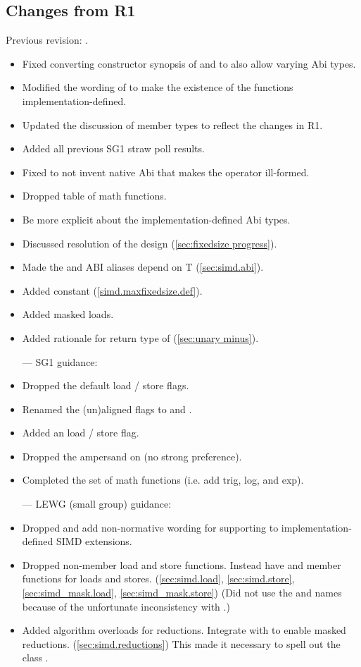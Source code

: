 \subsection{Changes from R1}
Previous revision: \parencite{P0214R1}.
\begin{itemize}
    \item Fixed converting constructor synopsis of \simd and \mask to also allow varying Abi types.
    \item Modified the wording of  to make the existence of the functions implementation-defined.
    \item Updated the discussion of member types to reflect the changes in R1.
    \item Added all previous SG1 straw poll results.
    \item Fixed  to not invent native Abi that makes the operator ill-formed.
    \item Dropped table of math functions.
    \item Be more explicit about the implementation-defined Abi types.
    \item Discussed resolution of the \fixedsizeN design (\ref{sec:fixedsize progress}).
    \item Made the  and  ABI aliases depend on \type T (\ref{sec:simd.abi}).
    \item Added  constant (\ref{simd.maxfixedsize.def}).
    \item Added masked loads.
    \item Added rationale for return type of \simd[::operator-()] (\ref{sec:unary minus}).
  \color{black}\item[---] SG1 guidance:
    \item Dropped the default load / store flags.
    \item Renamed the (un)aligned flags to  and .
    \item Added an  load / store flag.
    \item Dropped the ampersand on  (no strong preference).
    \item Completed the set of math functions (i.e. add trig, log, and exp).
  \color{black}\item[---] LEWG (small group) guidance:
    \item Dropped  and add non-normative wording for supporting  to implementation-defined SIMD extensions.
    \item Dropped non-member load and store functions.
    Instead have  and  member functions for loads and stores. (\ref{sec:simd.load}, \ref{sec:simd.store}, \ref{sec:simd_mask.load}, \ref{sec:simd_mask.store})
    (Did not use the  and  names because of the unfortunate inconsistency with \std{}.)
    \item Added algorithm overloads for \simd reductions.
    Integrate with  to enable masked reductions. (\ref{sec:simd.reductions})
    This made it necessary to spell out the class .
\end{itemize}
